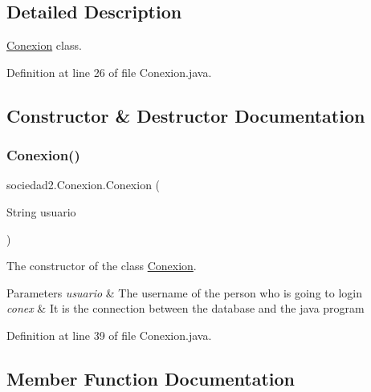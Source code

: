\subsection{Detailed Description}
\mbox{\hyperlink{classsociedad2_1_1_conexion}{Conexion}} class. 

Definition at line 26 of file Conexion.\+java.



\subsection{Constructor \& Destructor Documentation}
\mbox{\label{classsociedad2_1_1_conexion_ad0e04b0c05e775d68a227d3421f1bbd0}} 
\subsubsection{\texorpdfstring{Conexion()}{Conexion()}}
{\footnotesize\ttfamily sociedad2.\+Conexion.\+Conexion (\begin{DoxyParamCaption}\item[{String}]{usuario }\end{DoxyParamCaption})}



The constructor of the class \mbox{\hyperlink{classsociedad2_1_1_conexion}{Conexion}}. 


\begin{DoxyParams}{Parameters}
{\em usuario} & The username of the person who is going to login \\
\hline
{\em conex} & It is the connection between the database and the java program \\
\hline
\end{DoxyParams}


Definition at line 39 of file Conexion.\+java.



\subsection{Member Function Documentation}
\mbox{\label{classsociedad2_1_1_conexion_a9580aeb5847f414f376986051642e766}} 
